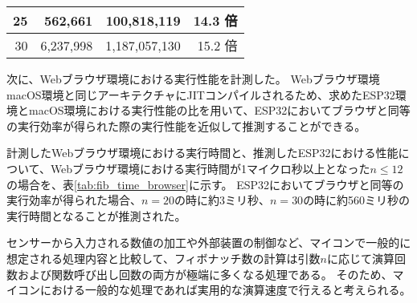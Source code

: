 \begin{table}[htbp]
\begin{center}
\begin{tabular}{rrrr}
      25 &   562,661 &   100,818,119 & 14.3 倍 \\ \hline
      30 & 6,237,998 & 1,187,057,130 & 15.2 倍 \\ \hline
    \end{tabular}
  \end{center}
\end{table}

次に、Webブラウザ環境における実行性能を計測した。
Webブラウザ環境macOS環境と同じアーキテクチャにJITコンパイルされるため、求めたESP32環境とmacOS環境における実行性能の比を用いて、ESP32においてブラウザと同等の実行効率が得られた際の実行性能を近似して推測することができる。

計測したWebブラウザ環境における実行時間と、推測したESP32における性能について、Webブラウザ環境における実行時間が1マイクロ秒以上となった$n\leq12$の場合を、表\ref{tab:fib_time_browser}に示す。
ESP32においてブラウザと同等の実行効率が得られた場合、$n=20$の時に約3ミリ秒、$n=30$の時に約560ミリ秒の実行時間となることが推測された。

センサーから入力される数値の加工や外部装置の制御など、マイコンで一般的に想定される処理内容と比較して、フィボナッチ数の計算は引数$n$に応じて演算回数および関数呼び出し回数の両方が極端に多くなる処理である。
そのため、マイコンにおける一般的な処理であれば実用的な演算速度で行えると考えられる。

